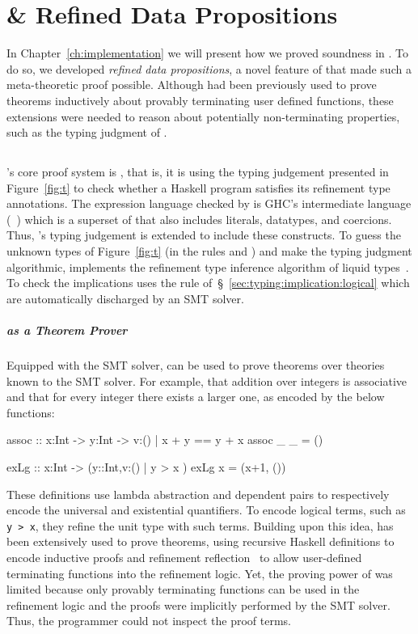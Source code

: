 \chapter{\lh \& Refined Data Propositions}
\label{ch:data-props}

In Chapter~\ref{ch:implementation} we will present how 
we proved 
\sysrf soundness in \lh. 
%
To do so, we developed \textit{refined data propositions}, 
a novel feature of \lh that made such 
a meta-theoretic proof possible. 
Although \lh had been previously used to prove theorems
inductively about provably terminating user defined 
functions, these extensions were needed to 
reason about potentially non-terminating properties, 
such as the typing judgment of \sysrf.


\section{\lh}
\lh's core proof system is \sysrf, 
that is, it is using the typing judgement 
presented in Figure~\ref{fig:t} to check whether a Haskell program 
satisfies its refinement type annotations.
%
The expression language checked by \lh is GHC's intermediate language 
(\coresyn~\cite{coresyn}) which is a superset of \sysrf that also includes 
literals, datatypes, and coercions. Thus, \lh's typing judgement is extended to 
include these constructs. 
%
To guess the unknown types of Figure~\ref{fig:t} (\ie in the rules \tSub and \tLet)
and make the typing judgment algorithmic,
\lh  implements the refinement type inference algorithm of 
liquid types~\cite{LiquidPLDI08}.
%
To check the implications \lh uses the \iLog 
rule of~\S~\ref{sec:typing:implication:logical}
which are automatically discharged by an SMT solver.

\paragraph{\lh as a Theorem Prover}
Equipped with the SMT solver, \lh can be used to prove theorems 
over theories known to the SMT solver.
For example, that addition over integers is associative 
and that for every integer there exists a larger one, 
as encoded by the below functions: 
\begin{mcode}
  assoc :: x:Int -> y:Int -> {v:() | x + y == y + x } 
  assoc _ _ = () 
  
  exLg :: x:Int -> (y::Int,{v:() | y > x })
  exLg x = (x+1, ())   
\end{mcode}
%
These definitions use lambda abstraction and dependent pairs 
to respectively encode the universal and existential quantifiers.
To encode logical terms, such as \texttt{y > x}, they refine the unit type 
with such terms. 
Building upon this idea, \lh has been extensively used 
to prove theorems, using recursive Haskell definitions to 
encode inductive proofs and refinement reflection~\cite{Vazou18}
to allow user-defined terminating functions into the refinement logic. 
Yet, the proving power of \lh was limited because 
only provably terminating functions can be used in the refinement logic
and the proofs were implicitly performed by the SMT solver.  
Thus, the programmer could not inspect the proof terms. 

